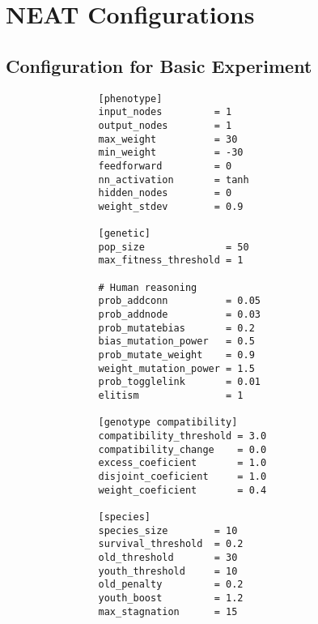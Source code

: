 \documentclass{article}
\begin{document}
	\section{NEAT Configurations} %
	\label{sec:neat_configurations}
	
		\subsection{Configuration for Basic Experiment} %
		\label{sub:configuration_for_basic_experiment}
			\begin{verbatim}
				[phenotype]
				input_nodes         = 1
				output_nodes        = 1
				max_weight          = 30
				min_weight          = -30
				feedforward         = 0
				nn_activation       = tanh 
				hidden_nodes        = 0
				weight_stdev        = 0.9

				[genetic]
				pop_size              = 50
				max_fitness_threshold = 1

				# Human reasoning
				prob_addconn          = 0.05
				prob_addnode          = 0.03
				prob_mutatebias       = 0.2
				bias_mutation_power   = 0.5
				prob_mutate_weight    = 0.9
				weight_mutation_power = 1.5
				prob_togglelink       = 0.01
				elitism               = 1

				[genotype compatibility]
				compatibility_threshold = 3.0
				compatibility_change    = 0.0
				excess_coeficient       = 1.0
				disjoint_coeficient     = 1.0
				weight_coeficient       = 0.4

				[species]
				species_size        = 10
				survival_threshold  = 0.2
				old_threshold       = 30
				youth_threshold     = 10
				old_penalty         = 0.2
				youth_boost         = 1.2
				max_stagnation      = 15
			\end{verbatim}

		\pagebreak
\end{document}
